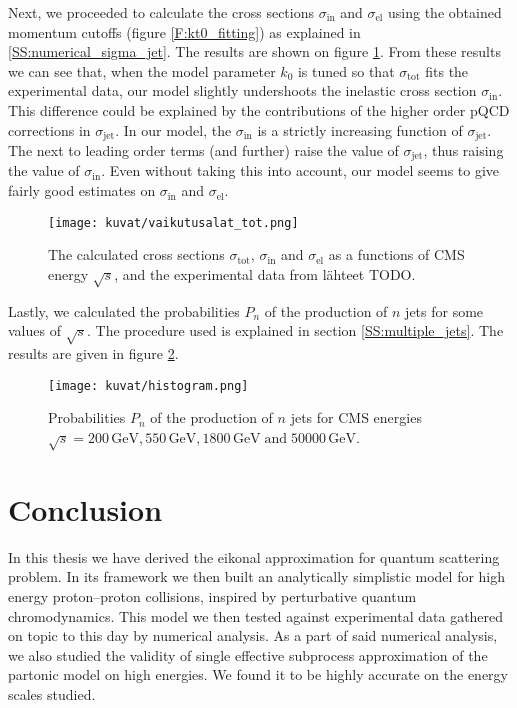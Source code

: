 \documentclass[a4paper, twoside, english, 12pt]{article}
\begin{document}
Next, we proceeded to calculate the cross sections $\sigma_{\text{in}}$ and $\sigma_{\text{el}}$ using the obtained momentum cutoffs (figure \ref{F:kt0_fitting}) as explained in \ref{SS:numerical_sigma_jet}. The results are shown on figure \ref{F:all_sigmas}. From these results we can see that, when the model parameter $k_0$ is tuned so that $\sigma_{\text{tot}}$ fits the experimental data, our model slightly undershoots the inelastic cross section $\sigma_{\text{in}}$. This difference could be explained by the contributions of the higher order pQCD corrections in $\sigma_{\text{jet}}$. In our model, the  $\sigma_{\text{in}}$ is a strictly increasing function of  $\sigma_{\text{jet}}$. The next to leading order terms (and further) raise the value of $\sigma_{\text{jet}}$, thus raising the value of $\sigma_{\text{in}}$. Even without taking this into account, our model seems to give fairly good estimates on  $\sigma_{\text{in}}$ and  $\sigma_{\text{el}}$.

\begin{figure}[h]
	\centering
	\texttt{[image: kuvat/vaikutusalat\_tot.png]}
	\caption{The calculated cross sections $\sigma_{\text{tot}}$, $\sigma_{\text{in}}$ and $\sigma_{\text{el}}$ as a functions of CMS energy $\sqrt{s}$, and the experimental data from lähteet TODO.}
	\label{F:all_sigmas}
\end{figure}

Lastly, we calculated the probabilities $P_n$ of the production of $n$ jets for some values of $\sqrt{s}$. The procedure used is explained in section \ref{SS:multiple_jets}. The results are given in figure \ref{F:multiple_jets}.

\begin{figure}[h]
	\centering
	\texttt{[image: kuvat/histogram.png]}
	\caption{Probabilities $P_n$ of the production of $n$ jets for CMS energies $\sqrt{s}=200\,\text{GeV}, 550\,\text{GeV}, 1800\,\text{GeV} \;\text{and}\; 50000\,\text{GeV}$.}
	\label{F:multiple_jets}
\end{figure}



\section{Conclusion}

In this thesis we have derived the eikonal approximation for quantum scattering problem. In its framework we then built an analytically simplistic model for high energy proton--proton collisions, inspired by perturbative quantum chromodynamics. This model we then tested against experimental data gathered on topic to this day by numerical analysis. As a part of said numerical analysis, we also studied the validity of single effective subprocess approximation of the partonic model on high energies. We found it to be highly accurate on the energy scales studied.
\end{document}
